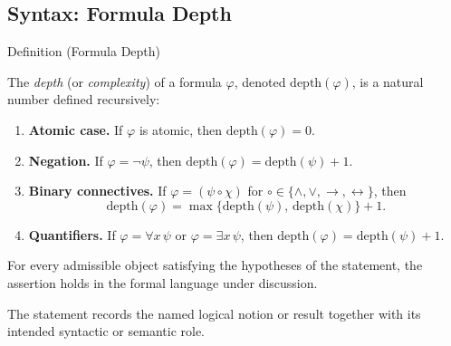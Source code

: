 
\subsection{Syntax: Formula Depth}


\begin{definitionbox}{Definition (Formula Depth)}
\begin{definition}\label{def:formula-depth}
The \emph{depth} (or \emph{complexity}) of a formula $\varphi$, denoted
$\mathrm{depth}(\varphi)$, is a natural number defined recursively:
\begin{enumerate}
  \item \textbf{Atomic case.} If $\varphi$ is atomic, then $\mathrm{depth}(\varphi) = 0$.

  \item \textbf{Negation.} If $\varphi = \neg \psi$, then
  $\mathrm{depth}(\varphi) = \mathrm{depth}(\psi) + 1$.

  \item \textbf{Binary connectives.} If $\varphi = (\psi \circ \chi)$
  for $\circ \in \{\wedge,\vee,\rightarrow,\leftrightarrow\}$, then
  \[
  \mathrm{depth}(\varphi) = \max\{\mathrm{depth}(\psi),\,\mathrm{depth}(\chi)\} + 1.
  \]

  \item \textbf{Quantifiers.} If $\varphi = \forall x\,\psi$ or $\varphi = \exists x\,\psi$,
  then $\mathrm{depth}(\varphi) = \mathrm{depth}(\psi) + 1$.
\end{enumerate}
\end{definition}
\end{definitionbox}
\begin{remark*}
For every admissible object satisfying the hypotheses of the statement, the
assertion holds in the formal language under discussion.
\end{remark*}

\begin{remark*}[Interpretation]
The statement records the named logical notion or result together with its
intended syntactic or semantic role.
\end{remark*}


